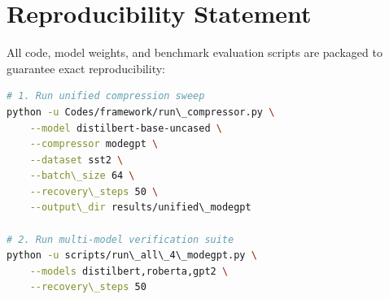\section{Reproducibility Statement}
All code, model weights, and benchmark evaluation scripts are packaged to guarantee exact reproducibility:
\begin{lstlisting}[language=bash]
# 1. Run unified compression sweep
python -u Codes/framework/run\_compressor.py \
    --model distilbert-base-uncased \
    --compressor modegpt \
    --dataset sst2 \
    --batch\_size 64 \
    --recovery\_steps 50 \
    --output\_dir results/unified\_modegpt

# 2. Run multi-model verification suite
python -u scripts/run\_all\_4\_modegpt.py \
    --models distilbert,roberta,gpt2 \
    --recovery\_steps 50
\end{lstlisting}
